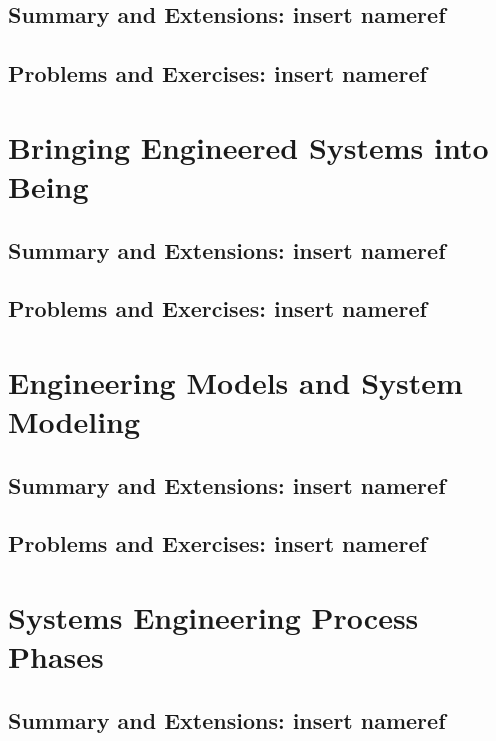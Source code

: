 \documentclass[11pt,fleqn]{book} %
\newcommand{\problems}[1]{} %
\begin{document}
    \section{Summary and Extensions: insert nameref}
    \section{Problems and Exercises: insert nameref}
      \problems{05}
    
  \chapter{Bringing Engineered Systems into Being}
    \section{Summary and Extensions: insert nameref}
    \section{Problems and Exercises: insert nameref}
      \problems{06}
  
  \chapter{Engineering Models and System Modeling}
    \section{Summary and Extensions: insert nameref}
    \section{Problems and Exercises: insert nameref}
      \problems{07}
  
  \chapter{Systems Engineering Process Phases}
    \section{Summary and Extensions: insert nameref}
\end{document}
